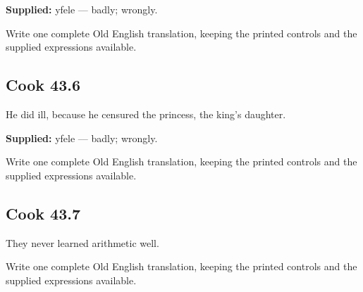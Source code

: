 \textbf{Supplied:} yfele — badly; wrongly.

Write one complete Old English translation, keeping the printed controls and the supplied expressions available.

\par\begin{minipage}{\linewidth}\raggedright
\subsection*{Cook 43.6}

He did ill, because he censured the princess, the king’s daughter.

\textbf{Supplied:} yfele — badly; wrongly.

Write one complete Old English translation, keeping the printed controls and the supplied expressions available.

\end{minipage}\par\addvspace{4pt}

\par\begin{minipage}{\linewidth}\raggedright
\subsection*{Cook 43.7}

They never learned arithmetic well.

Write one complete Old English translation, keeping the printed controls and the supplied expressions available.

\end{minipage}\par\addvspace{4pt}


